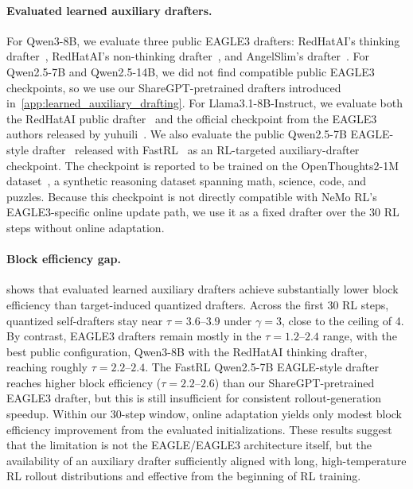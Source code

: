 \documentclass{llmxive}
\providecommand{\DraftLength}{\gamma}
\providecommand{\mal}{\tau}
\providecommand{\MAL}{block efficiency}
\begin{document}
\paragraph{Evaluated learned auxiliary drafters.}

For Qwen3-8B, we evaluate three public EAGLE3 drafters: RedHatAI's thinking drafter~\citep{redhatai2025qwen3eagle3thinking}, RedHatAI's non-thinking drafter~\citep{redhatai2025qwen3eagle3nothink}, and AngelSlim's drafter~\citep{angelslim2025qwen3eagle3}.
For Qwen2.5-7B and Qwen2.5-14B, we did not find compatible public EAGLE3 checkpoints, so we use our ShareGPT-pretrained drafters introduced in~\cref{app:learned_auxiliary_drafting}.
For Llama3.1-8B-Instruct, we evaluate both the RedHatAI public drafter~\citep{redhatai2025llama31eagle3} and the official checkpoint from the EAGLE3 authors released by yuhuili~\citep{yuhuili2024llama31eagle3}.
We also evaluate the public Qwen2.5-7B EAGLE-style drafter~\citep{mithanlab2026qwen25eagle} released with FastRL~\citep{hu2026taming} as an RL-targeted auxiliary-drafter checkpoint.
The checkpoint is reported to be trained on the OpenThoughts2-1M dataset~\citep{openthoughts2026openthoughts2}, a synthetic reasoning dataset spanning math, science, code, and puzzles.
Because this checkpoint is not directly compatible with NeMo RL's EAGLE3-specific online update path, we use it as a fixed drafter over the 30 RL steps without online adaptation.


\paragraph{Block efficiency gap.}

 shows that evaluated learned auxiliary drafters achieve substantially lower block efficiency than target-induced quantized drafters.
Across the first 30 RL steps, quantized self-drafters stay near $\mal{}=3.6$--$3.9$ under $\DraftLength=3$, close to the ceiling of 4.
By contrast, EAGLE3 drafters remain mostly in the $\mal{}=1.2$--$2.4$ range, with the best public configuration, Qwen3-8B with the RedHatAI thinking drafter, reaching roughly $\mal{}=2.2$--$2.4$.
The FastRL Qwen2.5-7B EAGLE-style drafter reaches higher \MAL{} ($\mal{}=2.2$--$2.6$) than our ShareGPT-pretrained EAGLE3 drafter, but this is still insufficient for consistent rollout-generation speedup.
Within our 30-step window, online adaptation yields only modest \MAL{} improvement from the evaluated initializations.
These results suggest that the limitation is not the EAGLE/EAGLE3 architecture itself, but the availability of an auxiliary drafter sufficiently aligned with long, high-temperature RL rollout distributions and effective from the beginning of RL training.
\end{document}
